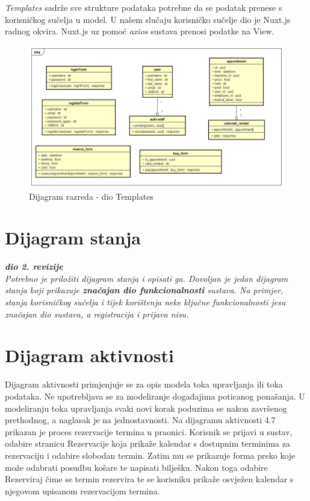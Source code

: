 		 	\pagebreak			
 			\emph{Templates} sadrže sve strukture podataka potrebne da se podatak prenese s korisničkog sučelja u model. U našem slučaju korisničko sučelje dio je Nuxt.js radnog okvira. Nuxt.js uz pomoć \emph{axios} sustava prenosi podatke na View.
 			\begin{figure}[H]
 				\includegraphics[scale=0.45]{slike/Razredni_dijagrami_Templates.PNG}
 				\centering
 				\caption{Dijagram razreda - dio Templates}
 				\label{fig:promjene}
 			\end{figure} 	
 		
			\pagebreak
 			
 			
		\section{Dijagram stanja}
			
			
			\textbf{\textit{dio 2. revizije}}\\
			
			\textit{Potrebno je priložiti dijagram stanja i opisati ga. Dovoljan je jedan dijagram stanja koji prikazuje \textbf{značajan dio funkcionalnosti} sustava. Na primjer, stanja korisničkog sučelja i tijek korištenja neke ključne funkcionalnosti jesu značajan dio sustava, a registracija i prijava nisu. }
			
			
			\eject 
		
		\section{Dijagram aktivnosti}
		
		Dijagram aktivnosti primjenjuje se za opis modela toka upravljanja ili toka podataka. Ne upotrebljava se za modeliranje događajima poticanog ponašanja. U modeliranju toka upravljanja svaki novi korak poduzima se nakon završenog prethodnog, a naglasak je na jednostavnosti. Na dijagramu aktivnosti 4.7 prikazan je
		proces rezervacije termina u praonici. Korisnik se prijavi u sustav, odabire stranicu Rezervacije koja prikaže kalendar s dostupnim terminima za rezervaciju i odabire slobodan termin. Zatim mu se prikazuje forma preko koje može odabrati posudbu košare te napisati bilješku. Nakon toga odabire Rezerviraj čime se termin rezervira te se korisniku prikaže osvježen kalendar s njegovom upisanom rezervacijom termina.

